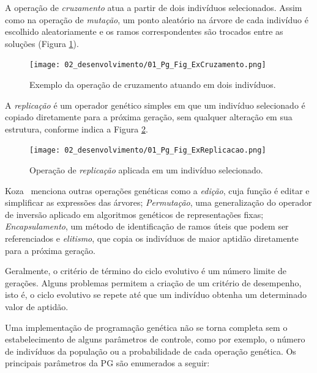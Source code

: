 A operação de \textit{cruzamento} atua a partir de dois indivíduos selecionados. Assim como na operação de \textit{mutação}, um ponto aleatório na árvore de cada indivíduo é escolhido aleatoriamente e os ramos correspondentes são trocados entre as soluções (Figura \ref{fig:1pg-excruzamento}).

\begin{figure}[H]
\centering
\texttt{[image: 02\_desenvolvimento/01\_Pg\_Fig\_ExCruzamento.png]}
\caption{Exemplo da operação de cruzamento atuando em dois indivíduos.}\label{fig:1pg-excruzamento}
\end{figure}

A \textit{replicação} é um operador genético simples em que um indivíduo selecionado é copiado diretamente para a próxima geração, sem qualquer alteração em sua estrutura, conforme indica a Figura \ref{fig:1pg-exreplicacao}.

\begin{figure}[H]
\centering
\texttt{[image: 02\_desenvolvimento/01\_Pg\_Fig\_ExReplicacao.png]}
\caption{Operação de \textit{replicação} aplicada em um indivíduo selecionado.}\label{fig:1pg-exreplicacao}
\end{figure}

Koza~\cite{koza92bookGp} menciona outras operações genéticas como a \textit{edição}, cuja função é editar e simplificar as expressões das árvores; \textit{Permutação}, uma generalização do operador de inversão aplicado em algoritmos genéticos de representações fixas; \textit{Encapsulamento}, um método de identificação de ramos úteis que podem ser referenciados e \textit{elitismo}, que copia os indivíduos de maior aptidão diretamente para a próxima geração.

Geralmente, o critério de término do ciclo evolutivo é um número limite de gerações. Alguns problemas permitem a criação de um critério de desempenho, isto é, o ciclo evolutivo se repete até que um indivíduo obtenha um determinado valor de aptidão.

Uma implementação de programação genética não se torna completa sem o estabelecimento de alguns parâmetros de controle, como por exemplo, o número de indivíduos da população ou a probabilidade de cada operação genética. Os principais parâmetros da PG são enumerados a seguir:

